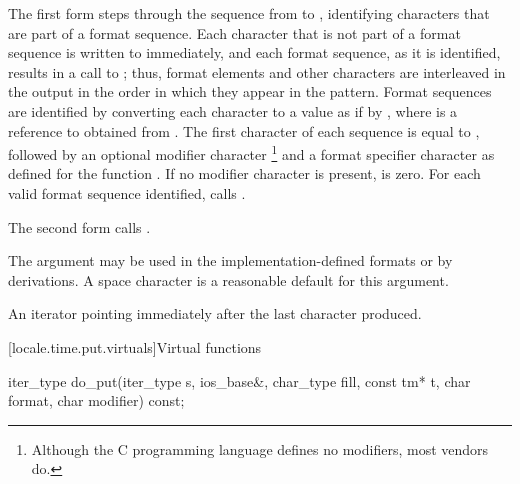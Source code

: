 \begin{itemdescr}
\pnum
\effects
The first form steps through the sequence from
to
,
identifying characters that are part of a format sequence.
Each character that is not part of a format sequence is written to
immediately, and each format sequence, as it is identified, results in
a call to
;
thus, format elements and other characters are interleaved in the output
in the order in which they appear in the pattern.
Format sequences are identified by converting each character
to a
value as if by
,
where
is a reference to
obtained from
.
The first character of each sequence is equal to
,
followed by an optional modifier character
\footnote{Although the C programming language defines no modifiers,
most vendors do.} and a format specifier character
as defined for the function
.
If no modifier character is present,
is zero.
For each valid format sequence identified, calls
.

\pnum
The second form calls
.

\pnum
\begin{note}
The  argument may be used in the implementation-defined
formats or by derivations. A space character is a reasonable
default for this argument.
\end{note}

\pnum
\returns
An iterator pointing immediately after the last character produced.
\end{itemdescr}

[locale.time.put.virtuals]{Virtual functions}

%
\begin{itemdecl}
iter_type do_put(iter_type s, ios_base&, char_type fill, const tm* t,
                 char format, char modifier) const;
\end{itemdecl}

